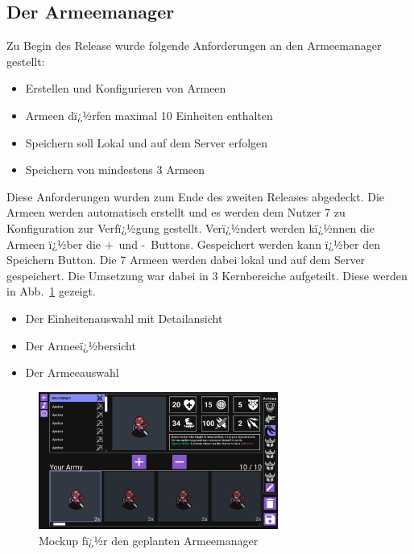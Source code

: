 \documentclass[12pt, titlepage]{scrartcl}
\newcommand{\Abb}[1]{%
	Abb.\ \ref{#1}%
}
\begin{document}
			\subsection{Der Armeemanager}
			Zu Begin des Release wurde folgende Anforderungen an den Armeemanager gestellt:
			\begin{itemize}
				\item Erstellen und Konfigurieren von Armeen
				\item Armeen dï¿½rfen maximal 10 Einheiten enthalten
				\item Speichern soll Lokal und auf dem Server erfolgen
				\item Speichern von mindestens 3 Armeen
			\end{itemize}
			Diese Anforderungen wurden zum Ende des zweiten Releases abgedeckt. Die Armeen werden automatisch erstellt und es werden dem Nutzer 7 zu Konfiguration zur Verfï¿½gung gestellt. Verï¿½ndert werden kï¿½nnen die Armeen ï¿½ber die \glqq +\grqq \ und \glqq -\grqq \ Buttons. Gespeichert werden kann ï¿½ber den Speichern Button. Die 7 Armeen werden dabei lokal und auf dem Server gespeichert. Die Umsetzung war dabei in 3 Kernbereiche aufgeteilt. Diese werden in \Abb{MockUpArmeemanager} gezeigt.
			\begin{itemize}
				\item Der Einheitenauswahl mit Detailansicht
				\item Der Armeeï¿½bersicht
				\item Der Armeeauswahl
			\end{itemize} 
		
			\begin{figure}[H] 
				\centering
				\includegraphics[width=0.7\textwidth]{ArmyBuilderMockUp.png}
				\caption{Mockup fï¿½r den geplanten Armeemanager}
				\label{MockUpArmeemanager}
			\end{figure}
			
\end{document}
